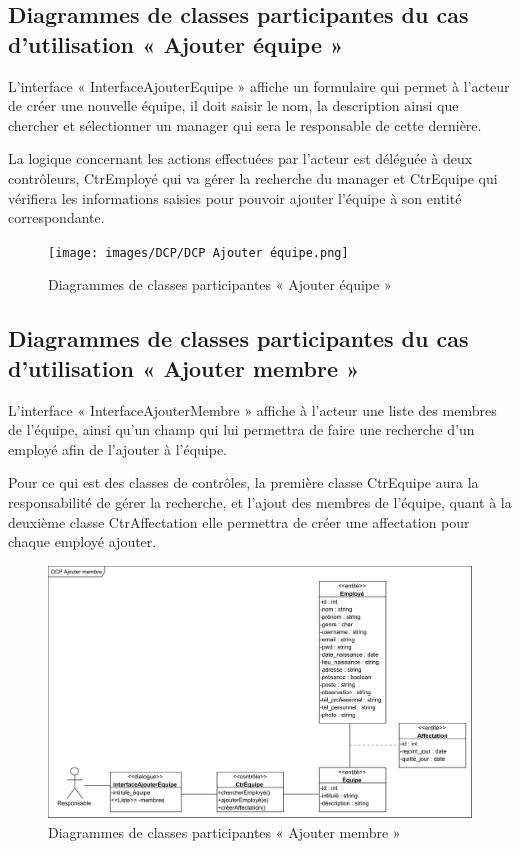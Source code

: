 \subsection*{Diagrammes de classes participantes du cas d'utilisation « Ajouter équipe »}
L’interface « InterfaceAjouterEquipe » affiche un formulaire qui permet à 
l’acteur de créer une nouvelle équipe, il doit saisir le nom, la description 
ainsi que chercher et sélectionner un manager qui sera le responsable de 
cette dernière.
        
La logique concernant les actions effectuées par l’acteur est déléguée à 
deux contrôleurs, CtrEmployé qui va gérer la recherche du manager et CtrEquipe
qui vérifiera les informations saisies pour pouvoir ajouter l’équipe à son 
entité correspondante.
       
\clearpage
            
\begin{figure}[h!]
    \centering
    \texttt{[image: images/DCP/DCP Ajouter équipe.png]}
    \caption{Diagrammes de classes participantes « Ajouter équipe »}
    \label{fig29}
\end{figure}
            
\subsection*{Diagrammes de classes participantes du cas d'utilisation « Ajouter membre »}
L’interface « InterfaceAjouterMembre » affiche à l’acteur une liste des membres 
de l’équipe, ainsi qu’un champ qui lui permettra de faire une recherche d’un 
employé afin de l’ajouter à l’équipe.
        
Pour ce qui est des classes de contrôles, la première classe CtrEquipe aura la 
responsabilité de gérer la recherche, et l’ajout des membres de l’équipe, quant
à la deuxième classe CtrAffectation elle permettra de créer une affectation pour 
chaque employé ajouter.
       
\clearpage
            
\begin{figure}[h!]
	\centering
    \includegraphics[scale=0.72]{images/DCP/DCP Ajouter membre.png}
    \caption{Diagrammes de classes participantes « Ajouter membre »}
    \label{fig30}
\end{figure}
            
